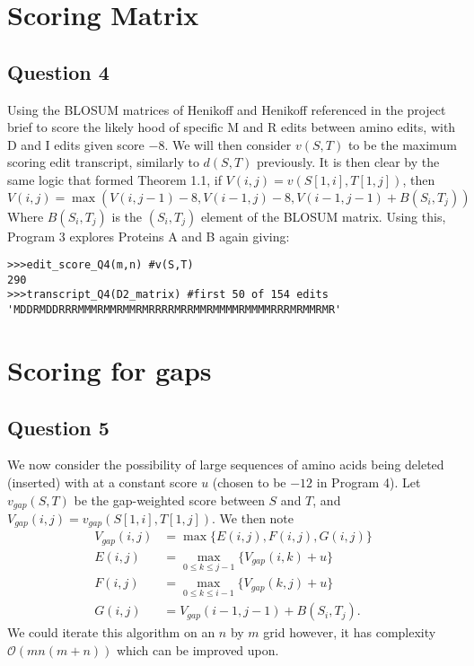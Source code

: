 \documentclass{article}
\begin{document}
\section{Scoring Matrix}

\subsection{Question 4}
Using the BLOSUM matrices of Henikoff and Henikoff referenced in the project brief to score the likely hood of specific M and R edits between amino edits, with D and I edits given score $-8$. We will then consider $v(S,T)$ to be the maximum scoring edit transcript, similarly to $d(S,T)$ previously. It is then clear by the same logic that formed Theorem 1.1, if $V(i,j)=v(S[1,i],T[1,j])$, then
\begin{equation}
V(i,j) = \max(V(i,j-1)-8,V(i-1,j)-8,V(i-1,j-1)+B(S_i,T_j))
\end{equation}
Where $B(S_i,T_j)$ is the $(S_i,T_j)$ element of the BLOSUM matrix. Using this, Program 3 explores Proteins A and B again giving:

\begin{lstlisting}
>>>edit_score_Q4(m,n) #v(S,T)
290
>>>transcript_Q4(D2_matrix) #first 50 of 154 edits
'MDDRMDDRRRMMMRMMRMMRMRRRRMRRMMRMMMMRMMMMRRRMRMMRMR'
\end{lstlisting}

\section{Scoring for gaps}

\subsection{Question 5}

We now consider the possibility of large sequences of amino acids being deleted (inserted) with at a constant score $u$ (chosen to be $-12$ in Program 4). Let $v_{gap}(S,T)$ be the gap-weighted score between $S$ and $T$, and $V_{gap}(i,j)= v_{gap}(S[1,i],T[1,j])$. We then note
\begin{equation*}
\begin{split}
V_{gap}(i,j) &= \max \{ E(i,j),F(i,j),G(i,j) \} \\
E(i,j) &= \underset{0\leq k \leq j-1}{\max} \{ V_{gap}(i,k) + u \} \\
F(i,j) &= \underset{0\leq k \leq i-1}{\max} \{V_{gap}(k,j)+ u \} \\
G(i,j) &= V_{gap}(i-1,j-1)+B(S_i,T_j).
\end{split}
\end{equation*}
We could iterate this algorithm on an $n$ by $m$ grid however, it has complexity $\mathcal{O}(mn(m+n))$ which can be improved upon. 
\end{document}
